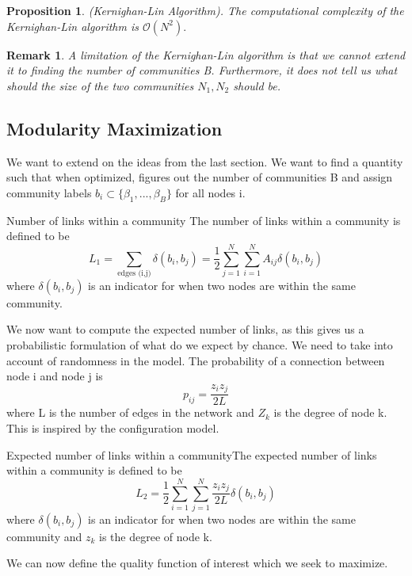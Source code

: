 \documentclass[twoside]{article}
\newtheorem{proposition}[theorem]{Proposition}
\newtheorem{remark}[theorem]{Remark}
\begin{document}
\begin{proposition}(Kernighan-Lin Algorithm). The computational complexity of the Kernighan-Lin algorithm is $\mathcal{O}(N^2).$
\end{proposition}

\begin{remark}A limitation of the Kernighan-Lin algorithm is that we cannot extend it to finding the number of communities B. Furthermore, it does not tell us what should the size of the two communities $N_1, N_2$ should be.
\end{remark}

\subsection{Modularity Maximization}

We want to extend on the ideas from the last section. We want to find a quantity such that when optimized, figures out the number of communities B and assign community labels $b_i \subset \{\beta_1,...,\beta_B\}$ for all nodes i.

\begin{definition_exam}{Number of links within a community}{}
The number of links within a community is defined to be
$$
L_1 = \sum_{\text{edges (i,j)}}\delta(b_i, b_j) = \frac{1}{2}\sum_{j=1}^{N}\sum_{i=1}^{N}A_{ij}\delta(b_i, b_j)
$$
where $\delta(b_i, b_j)$ is an indicator for when two nodes are within the same community.
\end{definition_exam}

We now want to compute the expected number of links, as this gives us a probabilistic formulation of what do we expect by chance. We need to take into account of randomness in the model. The probability of a connection between node i and node j is 
$$
p_{ij} = \frac{z_iz_j}{2L}
$$
where L is the number of edges in the network and $Z_k$ is the degree of node k. This is inspired by the configuration model.

\begin{definition_exam}{Expected number of links within a community}{}The expected number of links within a community is defined to be
$$
L_2 = \frac{1}{2}\sum_{i=1}^{N}\sum_{j=1}^{N}\frac{z_iz_j}{2L}\delta(b_i, b_j)
$$
where $\delta(b_i, b_j)$ is an indicator for when two nodes are within the same community and $z_k$ is the degree of node k.
\end{definition_exam}

We can now define the quality function of interest which we seek to maximize.
\end{document}
